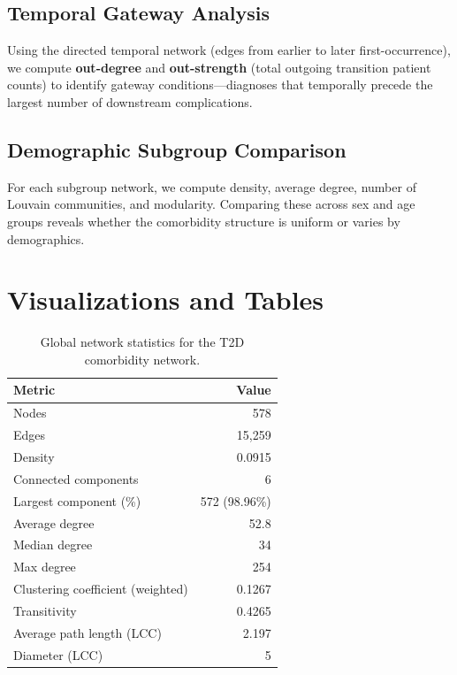 \documentclass[10pt,twocolumn]{article}
\begin{document}
\subsection{Temporal Gateway Analysis}

Using the directed temporal network (edges from earlier to later first-occurrence), we compute \textbf{out-degree} and \textbf{out-strength} (total outgoing transition patient counts) to identify gateway conditions---diagnoses that temporally precede the largest number of downstream complications.

\subsection{Demographic Subgroup Comparison}

For each subgroup network, we compute density, average degree, number of Louvain communities, and modularity.
Comparing these across sex and age groups reveals whether the comorbidity structure is uniform or varies by demographics.


\section{Visualizations and Tables}

\begin{table}[!htbp]
\centering
\caption{Global network statistics for the T2D comorbidity network.}
\label{tab:global}
\small
\begin{tabular}{lr}
\toprule
\textbf{Metric} & \textbf{Value} \\
\midrule
Nodes & 578 \\
Edges & 15,259 \\
Density & 0.0915 \\
Connected components & 6 \\
Largest component (\%) & 572 (98.96\%) \\
Average degree & 52.8 \\
Median degree & 34 \\
Max degree & 254 \\
Clustering coefficient (weighted) & 0.1267 \\
Transitivity & 0.4265 \\
Average path length (LCC) & 2.197 \\
Diameter (LCC) & 5 \\
\bottomrule
\end{tabular}
\end{table}
\end{document}
